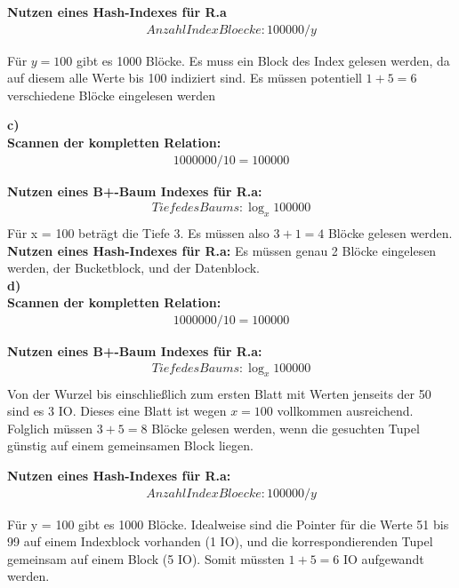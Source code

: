 \documentclass[12pt]{article}
\begin{document}
\noindent \textbf{Nutzen eines Hash-Indexes für R.a}
\begin{align*}
	Anzahl Index Bloecke: 100000 / y   
\end{align*}

\noindent
Für $y = 100$ gibt es 1000 Blöcke. Es muss ein Block des Index gelesen werden,
da auf diesem alle Werte bis 100 indiziert sind. Es müssen potentiell $1 + 5 = 6$ verschiedene Blöcke eingelesen werden

\newpage
\noindent \textbf{c)} \\
\textbf{Scannen der kompletten Relation:}
\begin{align*}
	1000000 / 10 = 100000 
\end{align*}

\noindent \textbf{Nutzen eines B+-Baum Indexes für R.a:}
\begin{align*}
	Tiefe des Baums:  \log_{x}100000 \\
\end{align*}
Für x = 100 beträgt die Tiefe 3. Es müssen also $3+1=4$ Blöcke gelesen werden.\\


\noindent \textbf{Nutzen eines Hash-Indexes für R.a: }
Es müssen genau 2 Blöcke eingelesen werden, der Bucketblock, und der Datenblock.\\


\noindent \textbf{d)} \\
\textbf{Scannen der kompletten Relation:}
\begin{align*}
	1000000 / 10 = 100000 
\end{align*}

\noindent \textbf{Nutzen eines B+-Baum Indexes für R.a:}
\begin{align*}
	Tiefe des Baums:  \log_{x}100000 \\
\end{align*}
Von der Wurzel bis einschließlich zum ersten Blatt mit Werten jenseits der 50 sind es 3 IO.
Dieses eine Blatt ist wegen $x=100$ vollkommen ausreichend. Folglich müssen
$3+5=8$ Blöcke gelesen werden, wenn die gesuchten Tupel günstig auf einem
gemeinsamen Block liegen.

\noindent \textbf{Nutzen eines Hash-Indexes für R.a:}
\begin{align*}
	Anzahl Index Bloecke: 100000 / y   
\end{align*}

\noindent Für y = 100 gibt es 1000 Blöcke. Idealweise sind die Pointer für die
Werte 51 bis 99 auf einem Indexblock vorhanden (1 IO), und die korrespondierenden Tupel
gemeinsam auf einem Block (5 IO). Somit müssten $1 + 5 = 6$ IO aufgewandt werden.
\end{document}

